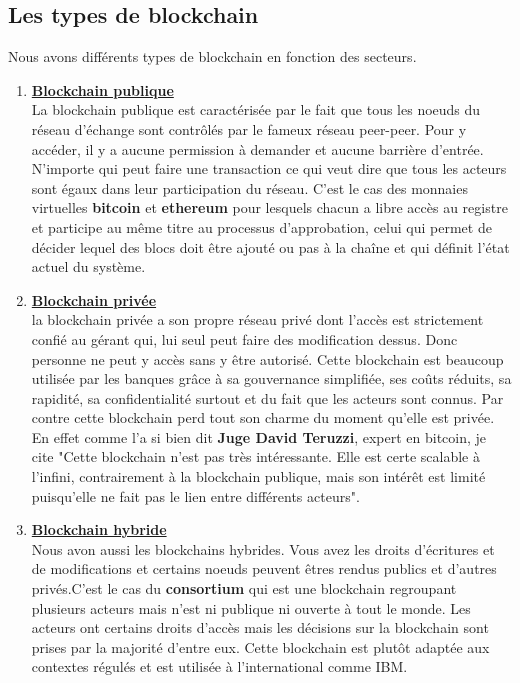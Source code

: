 \documentclass[12pt]{report}
\begin{document}
	\subsection{Les types de blockchain}
\hspace{1cm} Nous avons différents types de blockchain en fonction des secteurs. 

\begin{enumerate}

    \item \underline{\textbf{Blockchain publique}}\\ [0.3cm]
La blockchain publique est caractérisée par le fait que tous les noeuds du réseau d'échange sont contrôlés par le fameux réseau peer-peer. Pour y accéder, il y a aucune permission à demander et aucune barrière d'entrée. N'importe qui peut faire une transaction ce qui veut dire que tous les acteurs sont égaux dans leur participation du réseau. C'est le cas des monnaies virtuelles \textbf{bitcoin} et \textbf{ethereum} pour lesquels chacun a libre accès au registre et participe au même titre au processus d'approbation, celui qui permet de décider lequel des blocs doit être ajouté ou pas à la chaîne et qui définit l'état actuel du système.\\ 

\newpage
    \item \underline{\textbf{Blockchain privée}}\\[0.3cm]
la blockchain privée a son propre réseau privé dont l'accès est strictement confié au gérant qui, lui seul peut faire des modification dessus. Donc personne ne peut y accès sans y être autorisé. Cette blockchain est beaucoup utilisée par les banques grâce à sa gouvernance simplifiée, ses coûts réduits, sa rapidité, sa confidentialité surtout et du fait que les acteurs sont connus. Par contre cette blockchain perd tout son charme du moment qu'elle est privée. En effet comme l'a si bien dit \textbf{Juge David Teruzzi}, expert en bitcoin, je cite "Cette blockchain n'est pas très intéressante. Elle est certe scalable à l'infini, contrairement à la blockchain publique, mais son intérêt est limité puisqu'elle ne fait pas le lien entre différents acteurs". 

    \item \underline{\textbf{Blockchain hybride}}\\[0.3cm]
Nous avon aussi les blockchains hybrides. Vous avez les droits d'écritures et de  modifications et certains noeuds peuvent êtres rendus publics et d'autres privés.C'est le cas du \textbf{consortium} qui est une blockchain regroupant plusieurs acteurs mais n'est ni publique ni ouverte à tout le monde. Les acteurs ont certains droits d'accès mais les décisions sur la blockchain sont prises par la majorité d'entre eux. Cette blockchain est plutôt adaptée aux contextes régulés et est utilisée à l'international comme IBM.\\

\end{enumerate}
\end{document}
